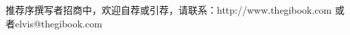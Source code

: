 \foreword
{}\mtcaddchapter 

推荐序撰写者招商中，欢迎自荐或引荐，请联系：http://www.thegibook.com 或者elvis@thegibook.com


\begin{comment}

Alex Champandard is the founder of AiGameDev.com, the largest online hub for arti - cial intelligence in games. He has worked in the industry as a senior AI programmer for many years, most notably for Rockstar Games where he worked on the animation technol- ogy of Max Payne 3. He regularly consults with leading studios in Europe, most notably at Guerrilla Games on the multiplayer bots for KillZone 2 and 3. Alex is also the event direc- tor for the Game/AI Conference, the largest independent event dedicated to AI in games.

Use the template \textit{foreword.tex} together with the Springer document class SVMono (monograph-type books) or SVMult (edited books) to style your foreword in the Springer layout. 

The foreword covers introductory remarks preceding the text of a book that are written by a \textit{person other than the author or editor} of the book. If applicable, the foreword precedes the preface which is written by the author or editor of the book.




\vspace{\baselineskip}
\begin{flushright}\noindent
Place, month year\hfill {\it Firstname  Surname}\\
\end{flushright}

\end{comment}
